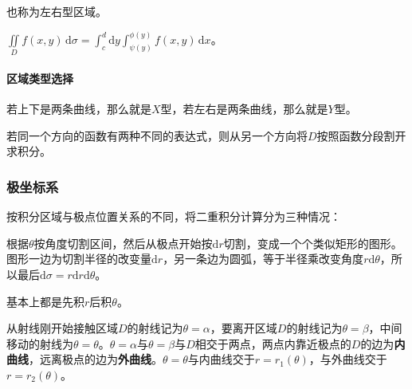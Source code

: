 \documentclass[UTF8, 12pt]{ctexart}
\begin{document}
\begin{minipage}{0.3\linewidth}
\end{minipage}
\hfill
\begin{minipage}{0.5\linewidth}
    也称为左右型区域。

    $\iint\limits_Df(x,y)\,\textrm{d}\sigma=\int_c^d\textrm{d}y\int_{\psi(y)}^{\phi(y)}f(x,y)\,\textrm{d}x$。
\end{minipage}

\paragraph{区域类型选择} \leavevmode \medskip

若上下是两条曲线，那么就是$X$型，若左右是两条曲线，那么就是$Y$型。

若同一个方向的函数有两种不同的表达式，则从另一个方向将$D$按照函数分段割开求积分。

\subsubsection{极坐标系}

按积分区域与极点位置关系的不同，将二重积分计算分为三种情况：

根据$\theta$按角度切割区间，然后从极点开始按$\textrm{d}r$切割，变成一个个类似矩形的图形。图形一边为切割半径的改变量$\textrm{d}r$，另一条边为圆弧，等于半径乘改变角度$r\textrm{d}\theta$，所以最后$\textrm{d}\sigma=r\textrm{d}r\textrm{d}\theta$。

基本上都是先积$r$后积$\theta$。

从射线刚开始接触区域$D$的射线记为$\theta=\alpha$，要离开区域$D$的射线记为$\theta=\beta$，中间移动的射线为$\theta=\theta$。$\theta=\alpha$与$\theta=\beta$与$D$相交于两点，两点内靠近极点的$D$的边为\textbf{内曲线}，远离极点的边为\textbf{外曲线}。$\theta=\theta$与内曲线交于$r=r_1(\theta)$，与外曲线交于$r=r_2(\theta)$。
\end{document}
